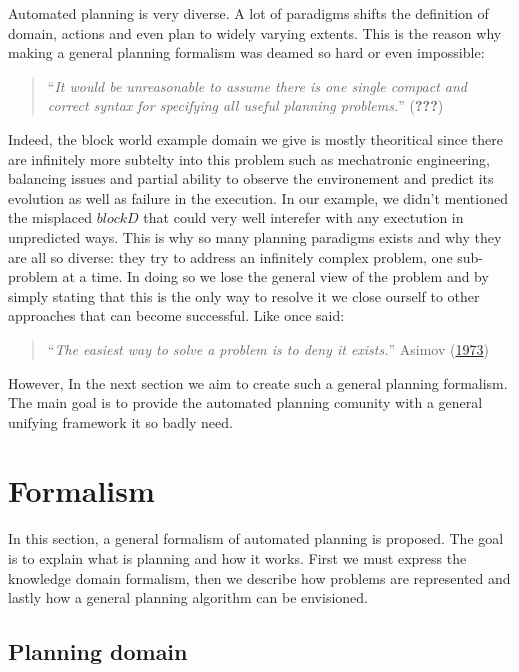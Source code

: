 \documentclass[11pt,a4paper,twoside,openright,titlepage,numbers=noenddot,headinclude,cleardoublepage=empty,openany]{scrreprt}
\theoremstyle{plain}
\theoremstyle{definition}
\theoremstyle{remark}
\begin{document}
Automated planning is very diverse. A lot of paradigms shifts the
definition of domain, actions and even plan to widely varying extents.
This is the reason why making a general planning formalism was deamed so
hard or even impossible:

\begin{quote}
``\emph{It would be unreasonable to assume there is one single compact
and correct syntax for specifying all useful planning problems.}''
\hfill ({\textbf{???}})
\end{quote}

Indeed, the block world example domain we give is mostly theoritical
since there are infinitely more subtelty into this problem such as
mechatronic engineering, balancing issues and partial ability to observe
the environement and predict its evolution as well as failure in the
execution. In our example, we didn't mentioned the misplaced \(blockD\)
that could very well interefer with any exectution in unpredicted ways.
This is why so many planning paradigms exists and why they are all so
diverse: they try to address an infinitely complex problem, one
sub-problem at a time. In doing so we lose the general view of the
problem and by simply stating that this is the only way to resolve it we
close ourself to other approaches that can become successful. Like once
said:

\begin{quote}
``\emph{The easiest way to solve a problem is to deny it exists.}''
\hfill Asimov (\protect\hyperlink{ref-asimov_gods_1973}{1973})
\end{quote}

However, In the next section we aim to create such a general planning
formalism. The main goal is to provide the automated planning comunity
with a general unifying framework it so badly need.

\hypertarget{formalism}{%
\section{Formalism}\label{formalism}}

In this section, a general formalism of automated planning is proposed.
The goal is to explain what is planning and how it works. First we must
express the knowledge domain formalism, then we describe how problems
are represented and lastly how a general planning algorithm can be
envisioned.

\hypertarget{planning-domain}{%
\subsection{Planning domain}\label{planning-domain}}
\end{document}
